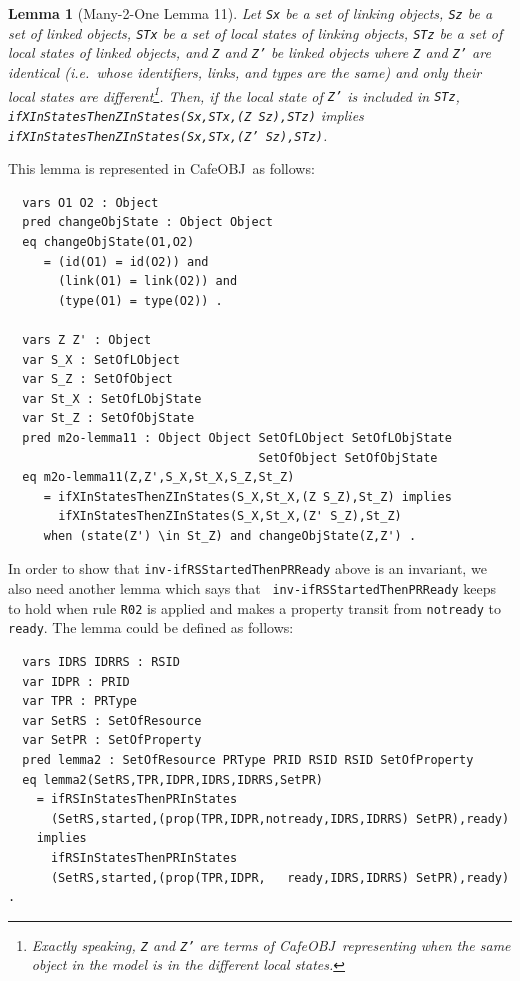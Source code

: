 \documentclass[12pt]{report}
\newtheorem{lemma}{Lemma}
\newcommand{\stt}[1]{{\small{\tt {#1}}}}
\newcommand{\cafeobj}{{\sf CafeOBJ}~}
\begin{document}
\begin{lemma}[Many-2-One Lemma 11]
  Let {\tt Sx} be a set of linking objects, {\tt Sz} be a set of
  linked objects, {\tt STx} be a set of local states of linking
  objects, {\tt STz} be a set of local states of linked objects, and
  {\tt Z} and {\tt Z'} be linked objects where {\tt Z} and {\tt Z'}
  are identical (i.e.\ whose identifiers, links, and types are the
  same) and only their local states are different\footnote{Exactly
    speaking, {\tt Z} and {\tt Z'} are terms of \cafeobj representing
    when the same object in the model is in the different local
    states.}.  Then, if the local state of {\tt Z'} is included in
  {\tt STz}, \stt{ifXInStatesThenZInStates(Sx,STx,(Z Sz),STz)}
  implies\\ \stt{ifXInStatesThenZInStates(Sx,STx,(Z' Sz),STz)}.
\end{lemma}
This lemma is represented in \cafeobj as follows:
\small
\begin{verbatim}
  vars O1 O2 : Object
  pred changeObjState : Object Object
  eq changeObjState(O1,O2)
     = (id(O1) = id(O2)) and 
       (link(O1) = link(O2)) and
       (type(O1) = type(O2)) .

  vars Z Z' : Object
  var S_X : SetOfLObject
  var S_Z : SetOfObject
  var St_X : SetOfLObjState
  var St_Z : SetOfObjState
  pred m2o-lemma11 : Object Object SetOfLObject SetOfLObjState
                                   SetOfObject SetOfObjState
  eq m2o-lemma11(Z,Z',S_X,St_X,S_Z,St_Z)
     = ifXInStatesThenZInStates(S_X,St_X,(Z S_Z),St_Z) implies
       ifXInStatesThenZInStates(S_X,St_X,(Z' S_Z),St_Z) 
     when (state(Z') \in St_Z) and changeObjState(Z,Z') .
\end{verbatim}
\normalsize
In order to show that {\tt inv-ifRSStartedThenPRReady} above is an
invariant, we also need another lemma which says that {\tt
  inv-ifRSStartedThenPRReady} keeps to hold when rule {\tt R02} is
applied and makes a property transit from {\tt notready} to {\tt
  ready}.  The lemma could be defined as follows:
\small
\begin{verbatim}
  vars IDRS IDRRS : RSID 
  var IDPR : PRID
  var TPR : PRType
  var SetRS : SetOfResource
  var SetPR : SetOfProperty
  pred lemma2 : SetOfResource PRType PRID RSID RSID SetOfProperty
  eq lemma2(SetRS,TPR,IDPR,IDRS,IDRRS,SetPR)
    = ifRSInStatesThenPRInStates
      (SetRS,started,(prop(TPR,IDPR,notready,IDRS,IDRRS) SetPR),ready)
    implies
      ifRSInStatesThenPRInStates
      (SetRS,started,(prop(TPR,IDPR,   ready,IDRS,IDRRS) SetPR),ready) .
\end{verbatim}
\end{document}
